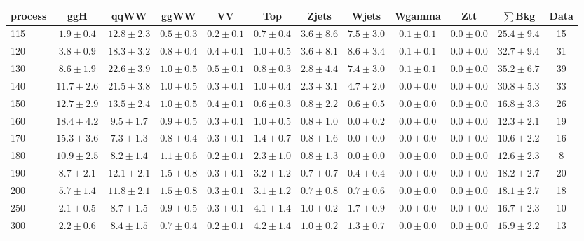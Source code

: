 \begin{table}[!hb]
{\footnotesize
 \begin{center}
 \begin{tabular}{l c c c c c c c c c c c }
 \hline
 process & ggH & qqWW & ggWW & VV & Top & Zjets & Wjets & Wgamma & Ztt & $\sum$Bkg & Data \\
 \hline
115 & $1.9\pm0.4$ & $12.8\pm2.3$ & $0.5\pm0.3$ & $0.2\pm0.1$ & $0.7\pm0.4$ & $3.6\pm8.6$ & $7.5\pm3.0$ & $0.1\pm0.1$ & $0.0\pm0.0$ & $25.4\pm9.4$ & 15 \\
120 & $3.8\pm0.9$ & $18.3\pm3.2$ & $0.8\pm0.4$ & $0.4\pm0.1$ & $1.0\pm0.5$ & $3.6\pm8.1$ & $8.6\pm3.4$ & $0.1\pm0.1$ & $0.0\pm0.0$ & $32.7\pm9.4$ & 31 \\
130 & $8.6\pm1.9$ & $22.6\pm3.9$ & $1.0\pm0.5$ & $0.5\pm0.1$ & $0.8\pm0.3$ & $2.8\pm4.4$ & $7.4\pm3.0$ & $0.1\pm0.1$ & $0.0\pm0.0$ & $35.2\pm6.7$ & 39 \\
140 & $11.7\pm2.6$ & $21.5\pm3.8$ & $1.0\pm0.5$ & $0.3\pm0.1$ & $1.0\pm0.4$ & $2.3\pm3.1$ & $4.7\pm2.0$ & $0.0\pm0.0$ & $0.0\pm0.0$ & $30.8\pm5.3$ & 33 \\
150 & $12.7\pm2.9$ & $13.5\pm2.4$ & $1.0\pm0.5$ & $0.4\pm0.1$ & $0.6\pm0.3$ & $0.8\pm2.2$ & $0.6\pm0.5$ & $0.0\pm0.0$ & $0.0\pm0.0$ & $16.8\pm3.3$ & 26 \\
160 & $18.4\pm4.2$ & $9.5\pm1.7$ & $0.9\pm0.5$ & $0.3\pm0.1$ & $1.0\pm0.5$ & $0.8\pm1.0$ & $0.0\pm0.2$ & $0.0\pm0.0$ & $0.0\pm0.0$ & $12.3\pm2.1$ & 19 \\
170 & $15.3\pm3.6$ & $7.3\pm1.3$ & $0.8\pm0.4$ & $0.3\pm0.1$ & $1.4\pm0.7$ & $0.8\pm1.6$ & $0.0\pm0.0$ & $0.0\pm0.0$ & $0.0\pm0.0$ & $10.6\pm2.2$ & 16 \\
180 & $10.9\pm2.5$ & $8.2\pm1.4$ & $1.1\pm0.6$ & $0.2\pm0.1$ & $2.3\pm1.0$ & $0.8\pm1.3$ & $0.0\pm0.0$ & $0.0\pm0.0$ & $0.0\pm0.0$ & $12.6\pm2.3$ & 8 \\
190 & $8.7\pm2.1$ & $12.1\pm2.1$ & $1.5\pm0.8$ & $0.3\pm0.1$ & $3.2\pm1.2$ & $0.7\pm0.7$ & $0.4\pm0.4$ & $0.0\pm0.0$ & $0.0\pm0.0$ & $18.2\pm2.7$ & 20 \\
200 & $5.7\pm1.4$ & $11.8\pm2.1$ & $1.5\pm0.8$ & $0.3\pm0.1$ & $3.1\pm1.2$ & $0.7\pm0.8$ & $0.7\pm0.6$ & $0.0\pm0.0$ & $0.0\pm0.0$ & $18.1\pm2.7$ & 18 \\
250 & $2.1\pm0.5$ & $8.7\pm1.5$ & $0.9\pm0.5$ & $0.3\pm0.1$ & $4.1\pm1.4$ & $1.0\pm0.2$ & $1.7\pm0.9$ & $0.0\pm0.0$ & $0.0\pm0.0$ & $16.7\pm2.3$ & 10 \\
300 & $2.2\pm0.6$ & $8.4\pm1.5$ & $0.7\pm0.4$ & $0.2\pm0.1$ & $4.2\pm1.4$ & $1.0\pm0.2$ & $1.3\pm0.7$ & $0.0\pm0.0$ & $0.0\pm0.0$ & $15.9\pm2.2$ & 13 \\

\end{tabular}
\end{center}}
\end{table}
